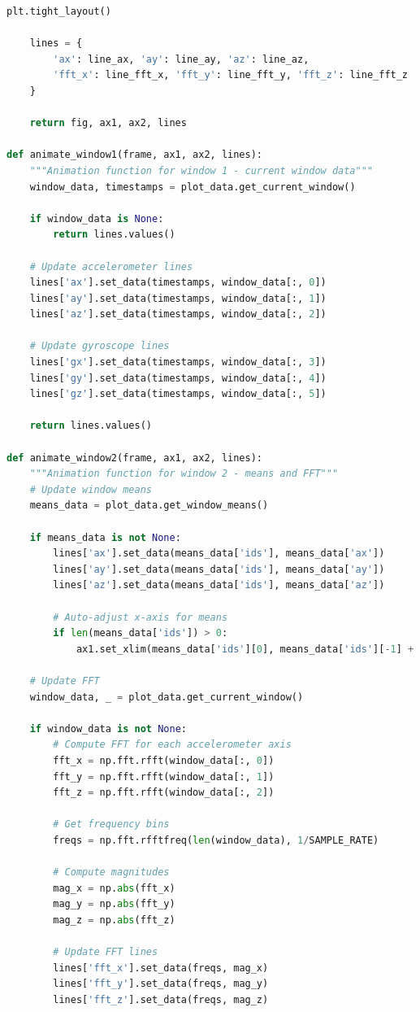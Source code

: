 \documentclass[conference]{IEEEtran}
\begin{document}
\begin{lstlisting}[language=Python]
    plt.tight_layout()
    
    lines = {
        'ax': line_ax, 'ay': line_ay, 'az': line_az,
        'fft_x': line_fft_x, 'fft_y': line_fft_y, 'fft_z': line_fft_z
    }
    
    return fig, ax1, ax2, lines

def animate_window1(frame, ax1, ax2, lines):
    """Animation function for window 1 - current window data"""
    window_data, timestamps = plot_data.get_current_window()
    
    if window_data is None:
        return lines.values()
    
    # Update accelerometer lines
    lines['ax'].set_data(timestamps, window_data[:, 0])
    lines['ay'].set_data(timestamps, window_data[:, 1])
    lines['az'].set_data(timestamps, window_data[:, 2])
    
    # Update gyroscope lines
    lines['gx'].set_data(timestamps, window_data[:, 3])
    lines['gy'].set_data(timestamps, window_data[:, 4])
    lines['gz'].set_data(timestamps, window_data[:, 5])
    
    return lines.values()

def animate_window2(frame, ax1, ax2, lines):
    """Animation function for window 2 - means and FFT"""
    # Update window means
    means_data = plot_data.get_window_means()
    
    if means_data is not None:
        lines['ax'].set_data(means_data['ids'], means_data['ax'])
        lines['ay'].set_data(means_data['ids'], means_data['ay'])
        lines['az'].set_data(means_data['ids'], means_data['az'])
        
        # Auto-adjust x-axis for means
        if len(means_data['ids']) > 0:
            ax1.set_xlim(means_data['ids'][0], means_data['ids'][-1] + 1)
    
    # Update FFT
    window_data, _ = plot_data.get_current_window()
    
    if window_data is not None:
        # Compute FFT for each accelerometer axis
        fft_x = np.fft.rfft(window_data[:, 0])
        fft_y = np.fft.rfft(window_data[:, 1])
        fft_z = np.fft.rfft(window_data[:, 2])
        
        # Get frequency bins
        freqs = np.fft.rfftfreq(len(window_data), 1/SAMPLE_RATE)
        
        # Compute magnitudes
        mag_x = np.abs(fft_x)
        mag_y = np.abs(fft_y)
        mag_z = np.abs(fft_z)
        
        # Update FFT lines
        lines['fft_x'].set_data(freqs, mag_x)
        lines['fft_y'].set_data(freqs, mag_y)
        lines['fft_z'].set_data(freqs, mag_z)
        

\end{lstlisting}
\end{document}
